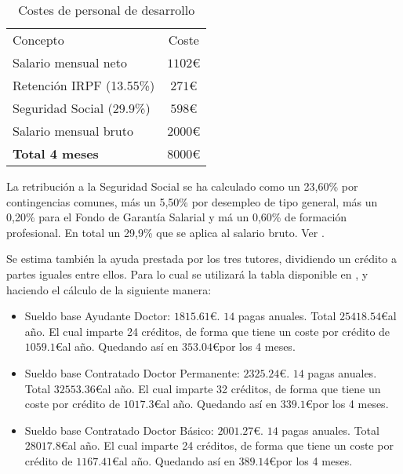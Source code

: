 \begin{table}[H]
	\begin{center}
		\begin{tabular}{l | c}\hline
			\toprule
			Concepto & Coste\\
			\otoprule
			Salario mensual neto & $1102 $\euro\\
			Retención IRPF (13.55\%)  & $271 $\euro\\
			Seguridad Social (29.9\%)& $598 $\euro\\
			Salario mensual bruto & $2000 $\euro\\
			\hline
			\textbf{Total 4 meses} & $8000 $\euro\\
			\bottomrule
		\end{tabular}
		\caption{Costes de personal de desarrollo}
		\label{tb:costesPersonal}
	\end{center}
\end{table}

La retribución a la Seguridad Social se ha calculado como un 23,60\% por contingencias comunes, más un 5,50\% por desempleo de tipo general, más un 0,20\% para el Fondo de Garantía Salarial y má un 0,60\% de formación profesional. En total un 29,9\% que se aplica al salario bruto. Ver \citep{wiki:basesCot18}.

Se estima también la ayuda prestada por los tres tutores, dividiendo un crédito a partes iguales entre ellos. Para lo cual se utilizará la tabla disponible en \citep{wiki:ubupdiwages}, y haciendo el cálculo de la siguiente manera: 

\begin{itemize}
\item Sueldo base Ayudante Doctor: $1815.61$\euro. $14$ pagas anuales. Total $25418.54$\euro  al año. El cual imparte 24 créditos, de forma que tiene un coste por crédito de $1059.1$\euro  al año. Quedando así en $353.04$\euro por los 4 meses.
\item Sueldo base Contratado Doctor Permanente: $2325.24$\euro. $14$ pagas anuales. Total $32553.36$\euro   al año. El cual imparte 32 créditos, de forma que tiene un coste por crédito de $1017.3$\euro  al año. Quedando así en $339.1$\euro por los 4 meses.
\item Sueldo base Contratado Doctor Básico: $2001.27$\euro. $14$ pagas anuales. Total $28017.8$\euro  al año. El cual imparte 24 créditos, de forma que tiene un coste por crédito de $1167.41$\euro  al año. Quedando así en $389.14$\euro por los 4 meses.
\end{itemize}

